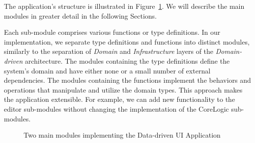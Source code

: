 The application's structure is illustrated in Figure~\ref{fig:architecture}.
We will describe the main modules in greater detail in the following Sections.

Each sub-module comprises various functions or type definitions.
In our implementation, we separate type definitions and functions into distinct modules, similarly to the separation of \emph{Domain} and \emph{Infrastructure} layers of the \emph{Domain-driven} architecture.
The modules containing the type definitions define the system's domain and have either none or a small number of external dependencies.
The modules containing the functions implement the behaviors and operations that manipulate and utilize the domain types.
This approach makes the application extensible.
For example, we can add new functionality to the editor sub-modules without changing the implementation of the CoreLogic sub-modules.
\begin{figure}[htbp]
	\centering
	\caption{Two main modules implementing the Data-driven UI Application}
	\label{fig:architecture}
\end{figure}


